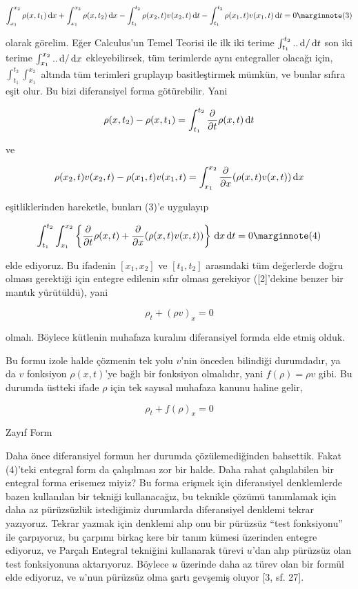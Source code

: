 \documentclass[12pt,fleqn]{article}\usepackage{../../common}
\begin{document}
$$
\int _{x_1}^{x_2} \rho(x,t_1) \ud x  +
\int _{x_1}^{x_2} \rho(x,t_2) \ud x -
\int_{t_1}^{t_2}  \rho(x_2,t) v(x_2,t) \ud t -
\int_{t_1}^{t_2} \rho(x_1,t) v(x_1,t) \ud t = 0
\mlabel{3}
$$

olarak görelim. Eğer Calculus'un Temel Teorisi ile ilk iki terime
$\int_{t_1}^{t_2} .. \,\mathrm{d} / \,\mathrm{d} t$ son iki terime $\int_{x_1}^{x_2} .. \,\mathrm{d} / \,\mathrm{d} x$
ekleyebilirsek, tüm terimlerde aynı entegraller olacağı için, 
$\int_{t_1}^{t_2} \int_{x_1}^{x_2} $ altında tüm terimleri gruplayıp
basitleştirmek mümkün, ve bunlar sıfıra eşit olur. Bu bizi diferansiyel
forma götürebilir. Yani

$$
\rho(x,t_2) - \rho(x,t_1) = \int_{t_1}^{t_2}
\frac{\partial }{\partial t} \rho(x,t) \,\mathrm{d} t
$$

ve

$$
\rho(x_2,t)v(x_2,t) - \rho(x_1,t)v(x_1,t) =
\int _{x_1}^{x_2} \frac{\partial }{\partial x} (\rho(x,t)v(x,t)) \,\mathrm{d} x
$$

eşitliklerinden hareketle, bunları (3)'e uygulayıp

$$
\int _{t_1}^{t_2} \int _{x_1}^{x_2}  \left\{
\frac{\partial }{\partial t} \rho(x,t)  +
\frac{\partial }{\partial x} (\rho(x,t)v(x,t))
\right\} \ud x \ud t = 0
\mlabel{4}
$$

elde ediyoruz. Bu ifadenin $[x_1,x_2]$ ve $[t_1,t_2]$ arasındaki tüm değerlerde
doğru olması gerektiği için entegre edilenin sıfır olması gerekiyor ([2]'dekine
benzer bir mantık yürütüldü), yani

$$
\rho_t + (\rho v)_x = 0
$$

olmalı. Böylece kütlenin muhafaza kuralını diferansiyel formda elde etmiş olduk.

Bu formu izole halde çözmenin tek yolu $v$'nin önceden bilindiği durumdadır, ya
da $v$ fonksiyon $\rho(x,t)$'ye bağlı bir fonksiyon olmalıdır, yani
$f(\rho) = \rho v$ gibi. Bu durumda üstteki ifade $\rho$ için tek sayısal
muhafaza kanunu haline gelir,

$$
\rho_t + f(\rho)_x = 0
$$

Zayıf Form

Daha önce diferansiyel formun her durumda çözülemediğinden bahsettik. Fakat
(4)'teki entegral form da çalışılması zor bir halde. Daha rahat çalışılabilen
bir entegral forma erisemez miyiz? Bu forma erişmek için diferansiyel
denklemlerde bazen kullanılan bir tekniği kullanacağız, bu teknikle çözümü
tanımlamak için daha az pürüzsüzlük istediğimiz durumlarda diferansiyel denklemi
tekrar yazıyoruz. Tekrar yazmak için denklemi alıp onu bir pürüzsüz ``test
fonksiyonu'' ile çarpıyoruz, bu çarpımı birkaç kere bir tanım kümesi üzerinden
entegre ediyoruz, ve Parçalı Entegral tekniğini kullanarak türevi $u$'dan alıp
pürüzsüz olan test fonksiyonuna aktarıyoruz. Böylece $u$ üzerinde daha az
türev olan bir formül elde ediyoruz, ve $u$'nun pürüzsüz olma şartı gevşemiş
oluyor [3, sf. 27].
\end{document}
